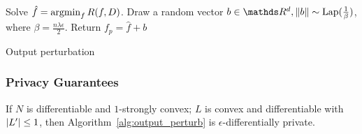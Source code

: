 \documentclass{article} %
\begin{document}
\begin{algorithm}[htb]
\begin{algorithmic}[1]
    \State Solve $\hat{f} = \operatorname*{argmin}_f R(f, D)$.
    \State Draw a random vector $b\in \R^d, \norm{b}\sim \text{Lap}(\frac{1}{\beta})$, where $\beta = \frac{n\lambda \epsilon}{2}$.
    \State Return $f_{p} = \hat{f} + b$
   \EndFunction
\end{algorithmic}
\caption{Output perturbation}\label{alg:output_perturb}
\end{algorithm}

\subsubsection{Privacy Guarantees}
\begin{theorem}
If $N$ is differentiable and $1$-strongly convex; $L$ is convex and differentiable with $\left\lvert L'\right\rvert \le 1$, then Algorithm~\ref{alg:output_perturb} is $\epsilon$-differentially private.
\end{theorem}
\end{document}

